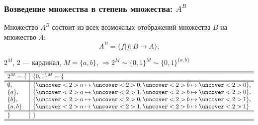 \begin{frame}
    \frametitle{Возведение множества в степень множества: $A^B$}
    
    \begin{definition}
        Множество $A^B$ состоит из всех возможных \alert{отображений} множества $B$ на множество $A$:
        \[
            A^B=\{f|f:B\to A\}.
        \]
    \end{definition}

    \begin{block}{$2^M$, $2$ --- кардинал, $M=\{a,b\}$, $\Rightarrow 2^M\sim \{0,1\}^M\sim \{0,1\}^{\{a,b\}}$}
        \[
        \begin{array}{l|l}
            \hline\hline
            2^M = \{          & \{0,1\}^M=\{                \\ \hline\hline
            \emptyset,    & \{\uncover<2>{a}\mapsto \uncover<2>{0}, 
                                  \uncover<2>{b}\mapsto \uncover<2>{0}\}, \\
            \{a\},            & \{\uncover<2>{a}\mapsto \uncover<2>{1}, 
                                  \uncover<2>{b}\mapsto \uncover<2>{0}\}, \\
            \{b\},            & \{\uncover<2>{a}\mapsto \uncover<2>{0}, 
                                  \uncover<2>{b}\mapsto \uncover<2>{1}\}, \\
            \{a,b\}           & \{\uncover<2>{a}\mapsto \uncover<2>{1}, 
                                  \uncover<2>{b}\mapsto \uncover<2>{1}\}  \\ \hline\hline
            \}                &\} \\ \hline\hline
        \end{array}
        \]
    \end{block}
\end{frame}


